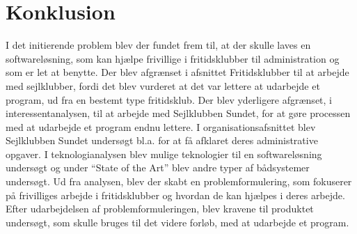 \section{Konklusion}

\cbstart

I det initierende problem blev der fundet frem til, at der skulle laves en softwareløsning, som kan hjælpe frivillige i fritidsklubber til administration og som er let at benytte. 
Der blev afgrænset i afsnittet Fritidsklubber  til at arbejde med sejlklubber, fordi det blev vurderet at det var lettere at udarbejde et program, ud fra en bestemt type fritidsklub. Der blev yderligere afgrænset, i interessentanalysen, til at arbejde med Sejlklubben Sundet, for at gøre processen med at udarbejde et program endnu lettere.
I organisationsafsnittet blev Sejlklubben Sundet undersøgt bl.a. for at få afklaret deres administrative opgaver. 
I teknologianalysen blev mulige teknologier til en softwareløsning undersøgt og under ``State of the Art'' blev andre typer af bådsystemer undersøgt. 
Ud fra analysen, blev der skabt en problemformulering, som fokuserer på frivilliges arbejde i fritidsklubber og hvordan de kan hjælpes i deres arbejde.
Efter udarbejdelsen af problemformuleringen, blev kravene til produktet undersøgt, som skulle bruges til det videre forløb, med at udarbejde et program.


\cbend



